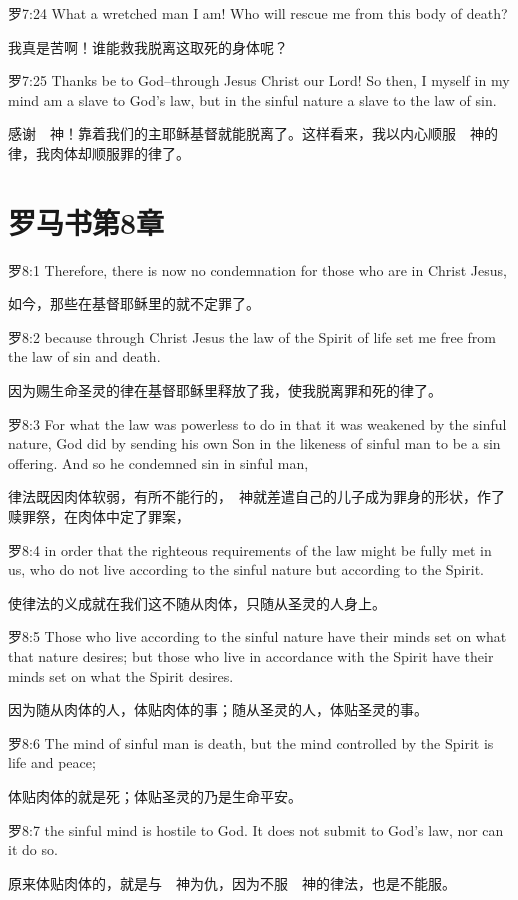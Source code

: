 \documentclass[a4paper,11pt,onecolumn,twoside]{ctexart}
\begin{document}
\begin{multicols}{2}
 罗7:24
 What a wretched man I am! Who will rescue me from this body of death?

 我真是苦啊！谁能救我脱离这取死的身体呢？


 罗7:25
 Thanks be to God--through Jesus Christ our Lord! So then, I myself in my mind am a slave to God's law, but in the sinful nature a slave to the law of sin.

 感谢　神！靠着我们的主耶稣基督就能脱离了。这样看来，我以内心顺服　神的律，我肉体却顺服罪的律了。


\section{ 罗马书第8章}
 罗8:1
 Therefore, there is now no condemnation for those who are in Christ Jesus,

 如今，那些在基督耶稣里的就不定罪了。


 罗8:2
 because through Christ Jesus the law of the Spirit of life set me free from the law of sin and death.

 因为赐生命圣灵的律在基督耶稣里释放了我，使我脱离罪和死的律了。


 罗8:3
 For what the law was powerless to do in that it was weakened by the sinful nature, God did by sending his own Son in the likeness of sinful man to be a sin offering. And so he condemned sin in sinful man,

 律法既因肉体软弱，有所不能行的，　神就差遣自己的儿子成为罪身的形状，作了赎罪祭，在肉体中定了罪案，


 罗8:4
 in order that the righteous requirements of the law might be fully met in us, who do not live according to the sinful nature but according to the Spirit.

 使律法的义成就在我们这不随从肉体，只随从圣灵的人身上。


 罗8:5
 Those who live according to the sinful nature have their minds set on what that nature desires; but those who live in accordance with the Spirit have their minds set on what the Spirit desires.

 因为随从肉体的人，体贴肉体的事；随从圣灵的人，体贴圣灵的事。


 罗8:6
 The mind of sinful man is death, but the mind controlled by the Spirit is life and peace;

 体贴肉体的就是死；体贴圣灵的乃是生命平安。


 罗8:7
 the sinful mind is hostile to God. It does not submit to God's law, nor can it do so.

 原来体贴肉体的，就是与　神为仇，因为不服　神的律法，也是不能服。



\end{multicols}
\end{document}
